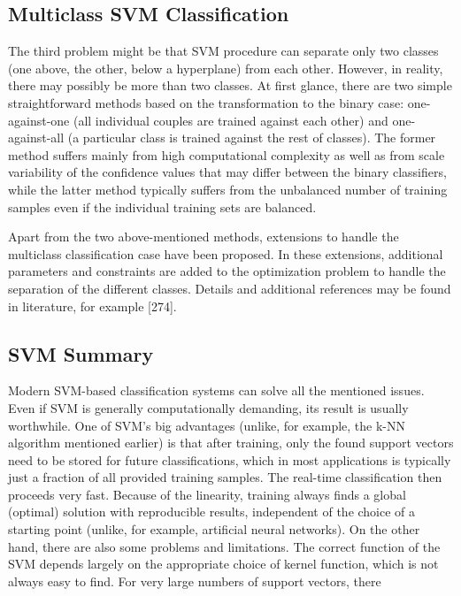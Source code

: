 \documentclass[11pt,openany,executivepaper]{book}
\begin{document}
\subsection{Multiclass SVM Classification}

The third problem might be that SVM procedure can separate only two classes
(one above, the other, below a hyperplane) from each other. However, in reality,
there may possibly be more than two classes.
At first glance, there are two simple straightforward methods based on the
transformation to the binary case: one-against-one (all individual couples are
trained against each other) and one-against-all (a particular class is trained
against the rest of classes).
The former method suffers mainly from high computational complexity as
well as from scale variability of the confidence values that may differ between the
binary classifiers, while the latter method typically suffers from the unbalanced
number of training samples even if the individual training sets are balanced.

Apart from the two above-mentioned methods, extensions to handle the multiclass classification case have been proposed. In these extensions, additional parameters and constraints are added to the optimization problem to handle the separation of the different classes. Details and additional references may be found
in literature, for example [274].

\subsection{SVM Summary}

Modern SVM-based classification systems can solve all the mentioned issues.
Even if SVM is generally computationally demanding, its result is usually worthwhile.
One of SVM’s big advantages (unlike, for example, the k-NN algorithm mentioned earlier) is that after training, only the found support vectors need to
be stored for future classifications, which in most applications is typically just
a fraction of all provided training samples. The real-time classification then proceeds very fast.
Because of the linearity, training always finds a global (optimal) solution with
reproducible results, independent of the choice of a starting point (unlike, for
example, artificial neural networks).
On the other hand, there are also some problems and limitations. The correct
function of the SVM depends largely on the appropriate choice of kernel function,
which is not always easy to find. For very large numbers of support vectors, there
\end{document}
